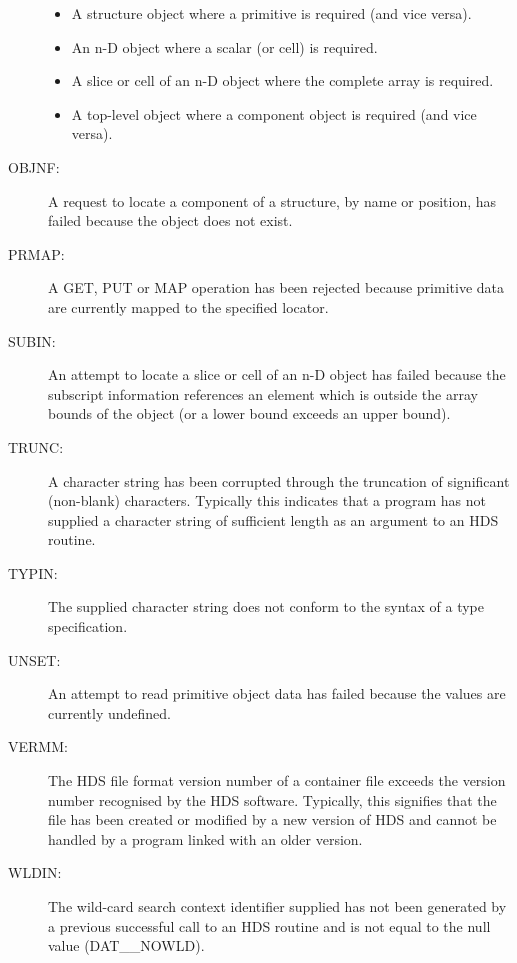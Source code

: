 \begin{description}
\begin{itemize}
\item A structure object where a primitive is required (and vice versa).

\item An n-D object where a scalar (or cell) is required.

\item A slice or cell of an n-D object where the complete array is required.

\item A top-level object where a component object is required (and vice versa).

\end{itemize}

\item [OBJNF:]
A request to locate a component of a structure, by name or position, has failed
because the object does not exist.

\item [PRMAP:]
A GET, PUT or MAP operation has been rejected because primitive data are
currently mapped to the specified locator.

\item [SUBIN:]
An attempt to locate a slice or cell of an n-D object has failed because the
subscript information references an element which is outside the array bounds
of the object (or a lower bound exceeds an upper bound).

\item [TRUNC:]
A character string has been corrupted through the truncation of significant
(non-blank) characters. Typically this indicates that a program has not
supplied a character string of sufficient length as an argument to an HDS
routine.

\item [TYPIN:]
The supplied character string does not conform to the syntax of a type
specification.

\item [UNSET:]
An attempt to read primitive object data has failed because the values are
currently undefined.

\item [VERMM:]
The HDS file format version number of a container file exceeds the version
number recognised by the HDS software. Typically, this signifies that the file
has been created or modified by a new version of HDS and cannot be handled by a
program linked with an older version.

\item [WLDIN:]
The wild-card search context identifier supplied has not been generated by a
previous successful call to an HDS routine and is not equal to the null value
(DAT\_\_NOWLD).

\end{description}

